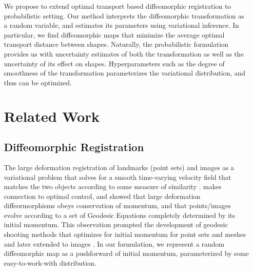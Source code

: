 \documentclass{6838publ}
\begin{document}

We propose to extend optimal transport based diffeomorphic registration to probabilistic setting. Our method interprets the diffeomorphic transformation as a random variable, and estimates its parameters using variational inference. In particular, we find diffeomorphic maps that minimize the average optimal transport distance between shapes. Naturally, the probabilistic formulation provides us with uncertainty estimates of both the transformation as well as the uncertainty of its effect on shapes. Hyperparameters such as the degree of smoothness of the transformation parameterizes the variational distribution, and thus can be optimized. 




\section{Related Work}

\subsection{Diffeomorphic Registration}

The large deformation registration of landmarks (point sets) and images as a variational problem that solves for a smooth time-varying velocity field that matches the two objects according to some measure of similarity \cite{joshiLandmarkMatchingLarge2000,begComputingLargeDeformation2005}. \cite{millerGeodesicShootingComputational2006,vialardDiffeomorphic3DImage2012} makes connection to optimal control, and showed that large deformation diffeormorphisms obeys conservation of momentum, and that points/images evolve according to a set of Geodesic Equations completely determined by its initial momentum. This observation prompted the development of geodesic shooting methods that optimizes for initial momentum for point sets and meshes \cite{vaillantStatisticsDiffeomorphismsTangent2004,allassonniereGeodesicShootingDiffeomorphic2005} and later extended to images \cite{vialardDiffeomorphic3DImage2012}. In our formulation, we represent a random diffeomorphic map as a pushforward of initial momentum, parameterized by some easy-to-work-with distribution.
\end{document}
